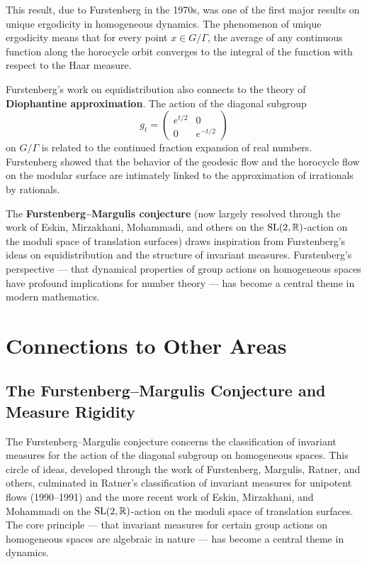 This result, due to Furstenberg in the 1970s, was one of the first major results on unique ergodicity in homogeneous dynamics. The phenomenon of unique ergodicity means that for every point \(x \in G/\Gamma\), the average of any continuous function along the horocycle orbit converges to the integral of the function with respect to the Haar measure.

Furstenberg's work on equidistribution also connects to the theory of \textbf{Diophantine approximation}. The action of the diagonal subgroup
\[
g_t = \begin{pmatrix} e^{t/2} & 0 \\ 0 & e^{-t/2} \end{pmatrix}
\]
on \(G/\Gamma\) is related to the continued fraction expansion of real numbers. Furstenberg showed that the behavior of the geodesic flow and the horocycle flow on the modular surface are intimately linked to the approximation of irrationals by rationals.

The \textbf{Furstenberg--Margulis conjecture} (now largely resolved through the work of Eskin, Mirzakhani, Mohammadi, and others on the \(\operatorname{SL}(2,\mathbb{R})\)-action on the moduli space of translation surfaces) draws inspiration from Furstenberg's ideas on equidistribution and the structure of invariant measures. Furstenberg's perspective --- that dynamical properties of group actions on homogeneous spaces have profound implications for number theory --- has become a central theme in modern mathematics.

\section{Connections to Other Areas}

\subsection{The Furstenberg--Margulis Conjecture and Measure Rigidity}

The Furstenberg--Margulis conjecture concerns the classification of invariant measures for the action of the diagonal subgroup on homogeneous spaces. This circle of ideas, developed through the work of Furstenberg, Margulis, Ratner, and others, culminated in Ratner's classification of invariant measures for unipotent flows (1990--1991) and the more recent work of Eskin, Mirzakhani, and Mohammadi on the \(\operatorname{SL}(2,\mathbb{R})\)-action on the moduli space of translation surfaces. The core principle --- that invariant measures for certain group actions on homogeneous spaces are algebraic in nature --- has become a central theme in dynamics.

